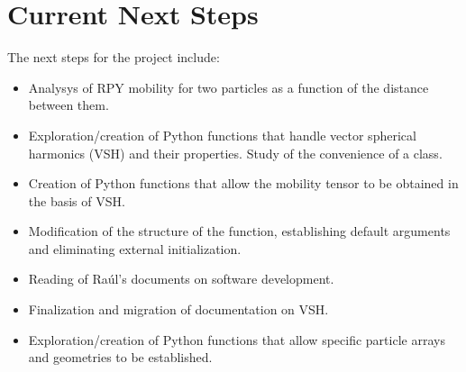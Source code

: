 \documentclass[12pt]{article} %
\begin{document}
\section{Current Next Steps}
The next steps for the project include:
\begin{itemize} 
    \item Analysys of RPY mobility for two particles as a function of the distance between them.
    \item Exploration/creation of Python functions that handle vector spherical harmonics (VSH) and their properties. Study of the convenience of a class.
    \item Creation of Python functions that allow the mobility tensor to be obtained in the basis of VSH.
    \item Modification of the structure of the  function, establishing default arguments and eliminating external initialization.
    \item Reading of Raúl's documents on software development.
    \item Finalization and migration of documentation on VSH.
    \item Exploration/creation of Python functions that allow specific particle arrays and geometries to be established.
\end{itemize}
\end{document}
